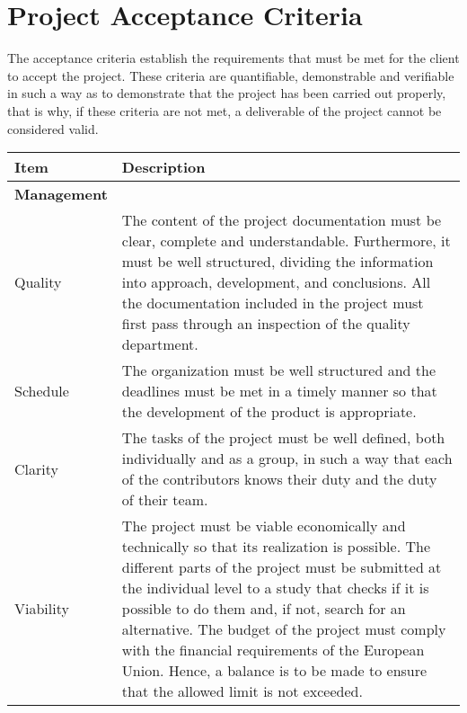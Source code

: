 \section{Project Acceptance Criteria}

The acceptance criteria establish the requirements that must be met for the client to accept the project. These criteria are quantifiable, demonstrable and verifiable in such a way as to demonstrate that the project has been carried out properly, that is why, if these criteria are not met, a deliverable of the project cannot be considered valid.

\begin{longtable}[H]{lp{10.2cm}}
	
	\toprule[2pt]
	
	\textbf{Item} & \textbf{Description} \\
	
	\midrule[1.5pt] 
	\endhead
	
	\textbf{Management} & \vspace{0.2cm} \\

	\midrule
	
	Quality & The content of the project documentation must be clear, complete and understandable. Furthermore, it must be well structured, dividing the information into approach, development, and conclusions.\vspace{0.2cm}
	\newline
	All the documentation included in the project must first pass through an inspection of the quality department.\vspace{0.2cm} \\

	\midrule	
	
	Schedule & The organization must be well structured and the deadlines must be met in a timely manner so that the development of the product is appropriate.\vspace{0.2cm} \\
	
	\midrule
	
	Clarity & The tasks of the project must be well defined, both individually and as a group, in such a way that each of the contributors knows their duty and the duty of their team.\vspace{0.2cm} \\
	
	\midrule
	
	Viability & The project must be viable economically and technically so that its realization is possible.\vspace{0.2cm}
	\newline
	The different parts of the project must be submitted at the individual level to a study that checks if it is possible to do them and, if not, search for an alternative.\vspace{0.2cm}
	\newline
	The budget of the project must comply with the financial requirements of the European Union. Hence, a balance is to be made to ensure that the allowed limit is not exceeded.\vspace{0.2cm}\\
	

\end{longtable}
